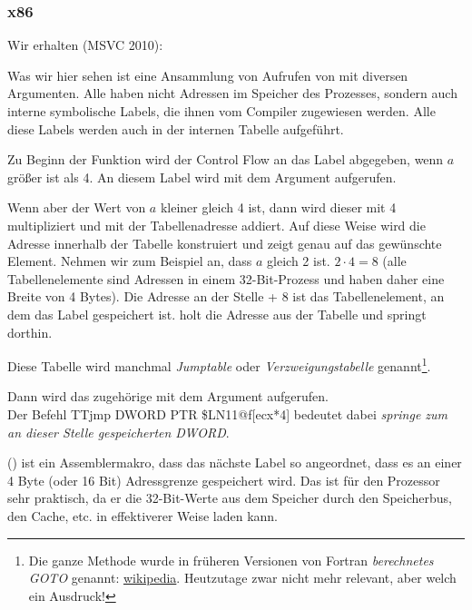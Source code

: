 \subsubsection{x86}


Wir erhalten (MSVC 2010):



Was wir hier sehen ist eine Ansammlung von Aufrufen von \printf mit diversen Argumenten.
Alle haben nicht Adressen im Speicher des Prozesses, sondern auch interne symbolische Labels, die ihnen vom Compiler
zugewiesen werden.
Alle diese Labels werden auch in der internen Tabelle  aufgeführt. 

Zu Beginn der Funktion wird der Control Flow an das Label  abgegeben, wenn $a$ größer ist als 4. An diesem
Label wird \printf mit dem Argument  aufgerufen.

Wenn aber der Wert von $a$ kleiner gleich 4 ist, dann wird dieser mit 4 multipliziert und mit der Tabellenadresse
 addiert. Auf diese Weise wird die Adresse innerhalb der Tabelle konstruiert und zeigt genau auf das
gewünschte Element. Nehmen wir zum Beispiel an, dass $a$ gleich 2 ist. $2\cdot 4=8$ (alle Tabellenelemente sind
Adressen in einem 32-Bit-Prozess und haben daher eine Breite von 4 Bytes).
Die Adresse an der Stelle  + 8 ist das Tabellenelement, an dem das Label  gespeichert ist.
\JMP holt die Adresse  aus der Tabelle und springt dorthin.

Diese Tabelle wird manchmal \emph{Jumptable} oder \emph{Verzweigungstabelle} genannt\footnote{Die ganze Methode wurde
in früheren Versionen von Fortran \emph{berechnetes GOTO} genannt:
\href{http://go.yurichev.com/17122}{wikipedia}.
Heutzutage zwar nicht mehr relevant, aber welch ein Ausdruck!}.

Dann wird das zugehörige \printf mit dem Argument  aufgerufen.\\
Der Befehl TT{jmp DWORD PTR \$LN11@f[ecx*4]} bedeutet dabei \emph{springe zum an dieser Stelle gespeicherten
DWORD}.

 () ist ein Assemblermakro, dass das nächste Label so angeordnet, dass es an einer 4 Byte
(oder 16 Bit) Adressgrenze gespeichert wird. Das ist für den Prozessor sehr praktisch, da er die 32-Bit-Werte aus dem
Speicher durch den Speicherbus, den Cache, etc. in effektiverer Weise laden kann.

